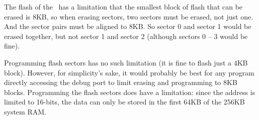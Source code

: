 The flash of the \jr\ has a limitation that the smallest block of flash that can be erased is 8KB, so when erasing sectors, two sectors must be erased, not just one. And the sector pairs must be aligned to 8KB. So sector 0 and sector 1 would be erased together, but not sector 1 and sector 2 (although sectors 0 -- 3 would be fine).

Programming flash sectors has no such limitation (it is fine to flash just a 4KB block). However, for simplicity's sake, it would probably be best for any program directly accessing the debug port to limit erasing and programming to 8KB blocks. Programming the flash sectors does have a limitation: since the address is limited to 16-bits, the data can only be stored in the first 64KB of the 256KB system RAM.
